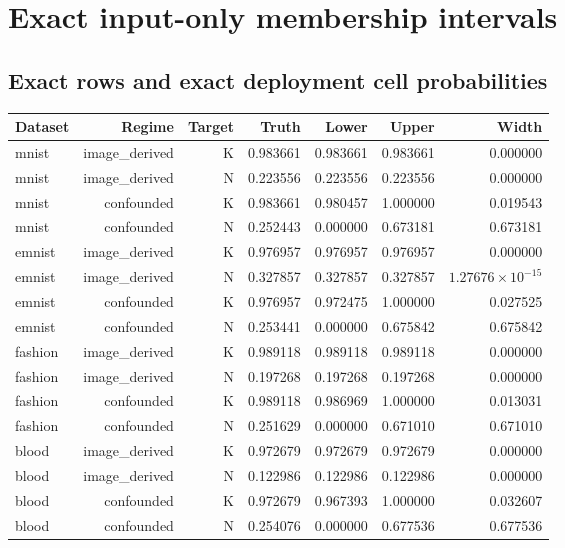 \reservetable
\section{Exact input-only membership intervals}

\reservetable
\subsection{Exact rows and exact deployment cell probabilities}

\begingroup\small
\setlength{\tabcolsep}{4pt}
\begin{longtable}{lrrrrrr}
\toprule

Dataset & Regime & Target & Truth & Lower & Upper & Width\\\midrule\endhead

mnist & image\_derived & K & 0.983661 & 0.983661 & 0.983661 & 0.000000\\

mnist & image\_derived & N & 0.223556 & 0.223556 & 0.223556 & 0.000000\\

mnist & confounded & K & 0.983661 & 0.980457 & 1.000000 & 0.019543\\

mnist & confounded & N & 0.252443 & 0.000000 & 0.673181 & 0.673181\\

emnist & image\_derived & K & 0.976957 & 0.976957 & 0.976957 & 0.000000\\

emnist & image\_derived & N & 0.327857 & 0.327857 & 0.327857 & $1.27676\times10^{-15}$\\

emnist & confounded & K & 0.976957 & 0.972475 & 1.000000 & 0.027525\\

emnist & confounded & N & 0.253441 & 0.000000 & 0.675842 & 0.675842\\

fashion & image\_derived & K & 0.989118 & 0.989118 & 0.989118 & 0.000000\\

fashion & image\_derived & N & 0.197268 & 0.197268 & 0.197268 & 0.000000\\

fashion & confounded & K & 0.989118 & 0.986969 & 1.000000 & 0.013031\\

fashion & confounded & N & 0.251629 & 0.000000 & 0.671010 & 0.671010\\

blood & image\_derived & K & 0.972679 & 0.972679 & 0.972679 & 0.000000\\

blood & image\_derived & N & 0.122986 & 0.122986 & 0.122986 & 0.000000\\

blood & confounded & K & 0.972679 & 0.967393 & 1.000000 & 0.032607\\

blood & confounded & N & 0.254076 & 0.000000 & 0.677536 & 0.677536\\

\bottomrule
\end{longtable}
